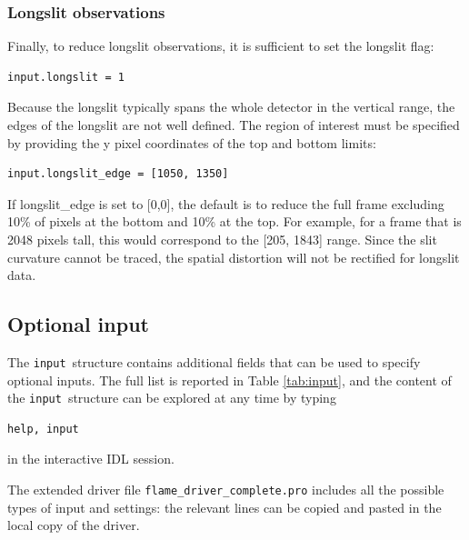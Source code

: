 \documentclass[a4paper]{article}
\newcommand{\inp}{\texttt{input}}
\begin{document}
\subsubsection{Longslit observations}
Finally, to reduce longslit observations, it is sufficient to set the longslit flag:
\begin{lstlisting}
input.longslit = 1
\end{lstlisting}
Because the longslit typically spans the whole detector in the vertical range, the edges of the longslit are not well defined. The region of interest must be specified by providing the y pixel coordinates of the top and bottom limits:
\begin{lstlisting}
input.longslit_edge = [1050, 1350]
\end{lstlisting}
If longslit\_edge is set to [0,0], the default is to reduce the full frame excluding 10\% of pixels at the bottom and 10\% at the top. For example, for a frame that is 2048 pixels tall, this would correspond to the [205, 1843] range. Since the slit curvature cannot be traced, the spatial distortion will not be rectified for longslit data.


\subsection{Optional input}

The \inp\ structure contains additional fields that can be used to specify optional inputs. The full list is reported in Table \ref{tab:input}, and the content of the \inp\ structure can be explored at any time by typing
\begin{lstlisting}
help, input
\end{lstlisting}
in the interactive IDL session.

The extended driver file \texttt{flame\_driver\_complete.pro} includes all the possible types of input and settings: the relevant lines can be copied and pasted in the local copy of the driver.
\end{document}
